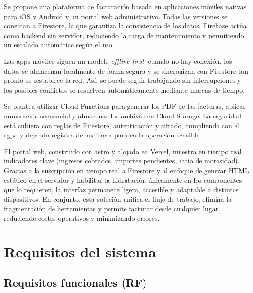 \begin{large}

Se propone una plataforma de facturación basada en aplicaciones móviles nativas para iOS y Android y un portal web administrativo. Todas las versiones se conectan a Firestore, lo que garantiza la consistencia de los datos. Firebase actúa como backend sin servidor, reduciendo la carga de mantenimiento y permitiendo un escalado automático según el uso.

Las apps móviles siguen un modelo \textit{offline-first}: cuando no hay conexión, los datos se almacenan localmente de forma segura y se sincronizan con Firestore tan pronto se restablece la red. Así, se puede seguir trabajando sin interrupciones y los posibles conflictos se resuelven automáticamente mediante marcas de tiempo.

Se plantea utilizar Cloud Functions para generar los PDF de las facturas, aplicar numeración secuencial y almacenar los archivos en Cloud Storage. La seguridad está cubiera con reglas de Firestore, autenticación y cifrado, cumpliendo con el \gls{rgpd} y dejando registro de auditoría para cada operación sensible.

El portal web, construido con \gls{astro} y alojado en Vercel, muestra en tiempo real indicadores clave (ingresos cobrados, importes pendientes, ratio de morosidad). Gracias a la suscripción en tiempo real a Firestore y al enfoque de generar HTML estático en el servidor y habilitar la hidratación únicamente en los componentes que lo requieren, la interfaz permanece ligera, accesible y adaptable a distintos dispositivos. En conjunto, esta solución unifica el flujo de trabajo, elimina la fragmentación de herramientas y permite facturar desde cualquier lugar, reduciendo costes operativos y minimizando errores.

\end{large}

\section{Requisitos del sistema}

\subsection{Requisitos funcionales (RF)}

